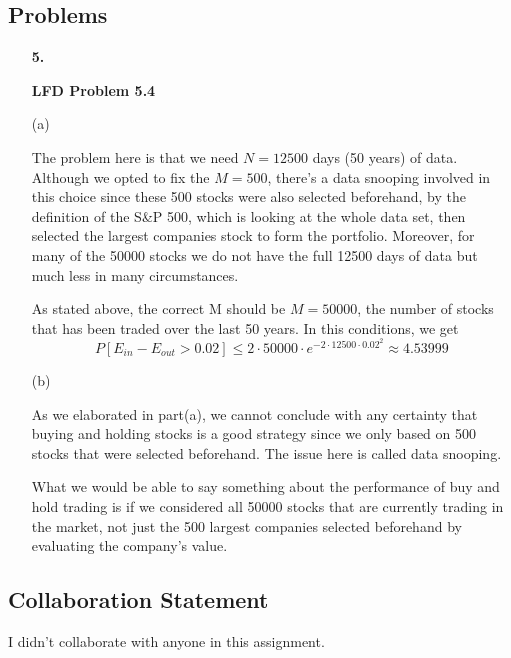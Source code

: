 \documentclass[11pt]{article}
\begin{document}
\subsection*{Problems}
\begin{enumerate}

\item[\textbf{5.}]

\textbf{LFD Problem 5.4}

(a)

The problem here is that we need $N=12500$ days (50 years) of data. Although we opted to fix the $M=500$, there's a data snooping involved in this choice since these 500 stocks were also selected beforehand, by the definition of the S\&P 500, which is looking at the whole data set, then selected the largest companies stock to form the portfolio. Moreover, for many of the 50000 stocks we do not have the full 12500 days of data but much less in many circumstances.

As stated above, the correct M should be $M=50000$, the number of stocks that has been traded over the last 50 years. In this conditions, we get $$P[E_{in} - E_{out} > 0.02] \leq 2 \cdot 50000 \cdot e^{-2\cdot 12500 \cdot 0.02^2} \approx 4.53999$$



(b)

As we elaborated in part(a), we cannot conclude with any certainty that buying and holding stocks is a good strategy since we only based on 500 stocks that were selected beforehand. The issue here is called data snooping.

What we would be able to say something about the performance of buy and hold trading is if we considered all 50000 stocks that are currently trading in the market, not just the 500 largest companies selected beforehand by evaluating the company's value.






\end{enumerate}
\pagebreak


\subsection*{Collaboration Statement}

I didn't collaborate with anyone in this assignment.
\end{document}
